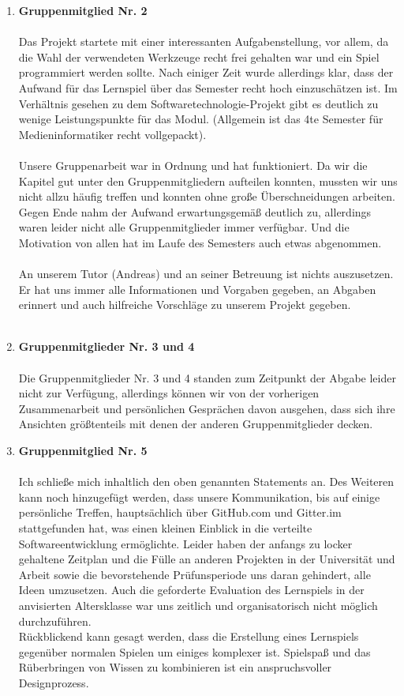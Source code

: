\documentclass[a4paper]{article}
\begin{document}
\begin{enumerate}
    \item \textbf{Gruppenmitglied Nr. 2}\\
    \\
    Das Projekt startete mit einer interessanten Aufgabenstellung, vor allem, da die Wahl der verwendeten Werkzeuge recht frei gehalten war und ein Spiel programmiert werden sollte. Nach einiger Zeit wurde allerdings klar, dass der Aufwand für das Lernspiel über das Semester recht hoch einzuschätzen ist. Im Verhältnis gesehen zu dem Softwaretechnologie-Projekt gibt es deutlich zu wenige Leistungspunkte für das Modul. (Allgemein ist das 4te Semester für Medieninformatiker recht vollgepackt).\\
    \\
    Unsere Gruppenarbeit war in Ordnung und hat funktioniert. Da wir die Kapitel gut unter den Gruppenmitgliedern aufteilen konnten, mussten wir uns nicht allzu häufig treffen und konnten ohne große Überschneidungen arbeiten. Gegen Ende nahm der Aufwand erwartungsgemäß deutlich zu, allerdings waren leider nicht alle Gruppenmitglieder immer verfügbar. Und die Motivation von allen hat im Laufe des Semesters auch etwas abgenommen.\\
    \\
    An unserem Tutor (Andreas) und an seiner Betreuung ist nichts auszusetzen. Er hat uns immer alle Informationen und Vorgaben gegeben, an Abgaben erinnert und auch hilfreiche Vorschläge zu unserem Projekt gegeben.\\
    \\

    \item \textbf{Gruppenmitglieder Nr. 3 und 4}\\
    \\
    Die Gruppenmitglieder Nr. 3 und 4 standen zum Zeitpunkt der Abgabe leider nicht zur Verfügung, allerdings können wir von der vorherigen Zusammenarbeit und persönlichen Gesprächen davon ausgehen, dass sich ihre Ansichten größtenteils mit denen der anderen Gruppenmitglieder decken.
    \\

    \item \textbf{Gruppenmitglied Nr. 5}\\
    \\
    Ich schließe mich inhaltlich den oben genannten Statements an. Des Weiteren kann noch hinzugefügt werden, dass unsere Kommunikation, bis auf einige persönliche Treffen, hauptsächlich über GitHub.com und Gitter.im stattgefunden hat, was einen kleinen Einblick in die verteilte Softwareentwicklung ermöglichte. Leider haben der anfangs zu locker gehaltene Zeitplan und die Fülle an anderen Projekten in der Universität und Arbeit sowie die bevorstehende Prüfunsperiode uns daran gehindert, alle Ideen umzusetzen. Auch die geforderte Evaluation des Lernspiels in der anvisierten Altersklasse war uns zeitlich und organisatorisch nicht möglich durchzuführen.
    \\
    Rückblickend kann gesagt werden, dass die Erstellung eines Lernspiels gegenüber normalen Spielen um einiges komplexer ist. Spielspaß und das Rüberbringen von Wissen zu kombinieren ist ein anspruchsvoller Designprozess.
    \\


\end{enumerate}
\end{document}
